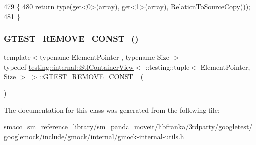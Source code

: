 \begin{DoxyCode}
479                                                                     \{
480     \textcolor{keywordflow}{return} \hyperlink{classtesting_1_1internal_1_1StlContainerView_3_01_1_1testing_1_1tuple_3_01ElementPointer_00_01Size_01_4_01_4_aedefb897170f76518afbca6f87b5467c}{type}(get<0>(array), get<1>(array), RelationToSourceCopy());
481   \}
\end{DoxyCode}
\mbox{\label{classtesting_1_1internal_1_1StlContainerView_3_01_1_1testing_1_1tuple_3_01ElementPointer_00_01Size_01_4_01_4_a2b1dd06842cb431ef647b85707ce52ff}} 
\subsubsection{\texorpdfstring{G\+T\+E\+S\+T\+\_\+\+R\+E\+M\+O\+V\+E\+\_\+\+C\+O\+N\+S\+T\+\_\+()}{GTEST\_REMOVE\_CONST\_()}}
{\footnotesize\ttfamily template$<$typename Element\+Pointer , typename Size $>$ \\
typedef \hyperlink{classtesting_1_1internal_1_1StlContainerView}{testing\+::internal\+::\+Stl\+Container\+View}$<$ \+::testing\+::tuple$<$ Element\+Pointer, Size $>$ $>$\+::G\+T\+E\+S\+T\+\_\+\+R\+E\+M\+O\+V\+E\+\_\+\+C\+O\+N\+S\+T\+\_\+ (\begin{DoxyParamCaption}\item[{typename \hyperlink{structtesting_1_1internal_1_1PointeeOf}{internal\+::\+Pointee\+Of}$<$ Element\+Pointer $>$\+::\hyperlink{classtesting_1_1internal_1_1StlContainerView_3_01_1_1testing_1_1tuple_3_01ElementPointer_00_01Size_01_4_01_4_aedefb897170f76518afbca6f87b5467c}{type}}]{ }\end{DoxyParamCaption})}



The documentation for this class was generated from the following file\+:\begin{DoxyCompactItemize}
\item 
smacc\+\_\+sm\+\_\+reference\+\_\+library/sm\+\_\+panda\+\_\+moveit/libfranka/3rdparty/googletest/googlemock/include/gmock/internal/\hyperlink{gmock-internal-utils_8h}{gmock-\/internal-\/utils.\+h}\end{DoxyCompactItemize}
